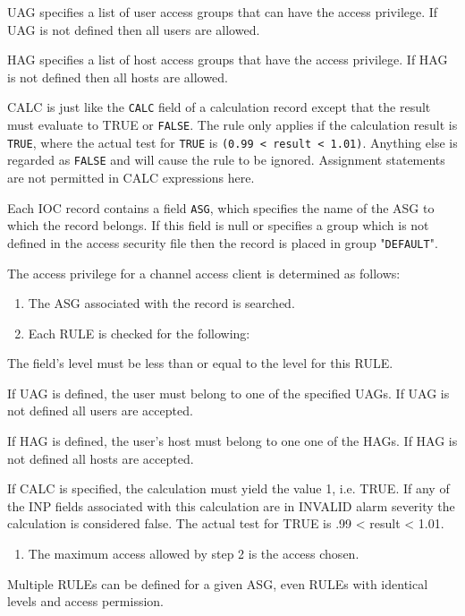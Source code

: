 UAG specifies a list of user access groups that can have the access privilege. If UAG is not defined 
then all users are allowed.

HAG specifies a list of host access groups that have the access privilege. If HAG is not defined then 
all hosts are allowed.

CALC is just like the \verb|CALC| field of a calculation record except that the result must evaluate to TRUE 
or \verb|FALSE|. The rule only applies if the calculation result is \verb|TRUE|, where the actual test for \verb|TRUE| is 
\verb|(0.99 < result < 1.01)|. Anything else is regarded as \verb|FALSE| and will cause the rule to be 
ignored. Assignment statements are not permitted in CALC expressions here.

Each IOC record contains a field \verb|ASG|, which specifies the name of the ASG to which the record belongs. If this field is 
null or specifies a group which is not defined in the access security file then the record is placed in group "\verb|DEFAULT|".

The access privilege for a channel access client is determined as follows:

\begin{enumerate}\item The ASG associated with the record is searched.

\item Each RULE is checked for the following:

\end{enumerate}The field's level must be less than or equal to the level for this RULE.

If UAG is defined, the user must belong to one of the specified UAGs. If UAG is not defined all users are 
accepted.

If HAG is defined, the user's host must belong to one one of the HAGs. If HAG is not defined all hosts are 
accepted.

If CALC is specified, the calculation must yield the value 1, i.e. TRUE. If any of the INP fields associated 
with this calculation are in INVALID alarm severity the calculation is considered false. The actual test for 
TRUE is .99 \textless{} result \textless{} 1.01.

\begin{enumerate}\item The maximum access allowed by step 2 is the access chosen.

\end{enumerate}Multiple RULEs can be defined for a given ASG, even RULEs with identical levels and access permission.

